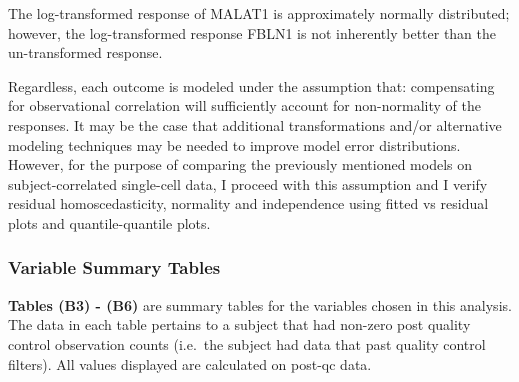 \documentclass[12pt,]{article}
\begin{document}
The log-transformed response of MALAT1 is approximately normally
distributed; however, the log-transformed response FBLN1 is not
inherently better than the un-transformed response.

Regardless, each outcome is modeled under the assumption that:
compensating for observational correlation will sufficiently account for
non-normality of the responses. It may be the case that additional
transformations and/or alternative modeling techniques may be needed to
improve model error distributions. However, for the purpose of comparing
the previously mentioned models on subject-correlated single-cell data,
I proceed with this assumption and I verify residual homoscedasticity,
normality and independence using fitted vs residual plots and
quantile-quantile plots.

\hypertarget{variable-summary-tables}{%
\subsubsection{Variable Summary Tables}\label{variable-summary-tables}}

\textbf{Tables (B3) - (B6)} are summary tables for the variables chosen
in this analysis. The data in each table pertains to a subject that had
non-zero post quality control observation counts (i.e.~the subject had
data that past quality control filters). All values displayed are
calculated on post-qc data.

\newpage
\end{document}
